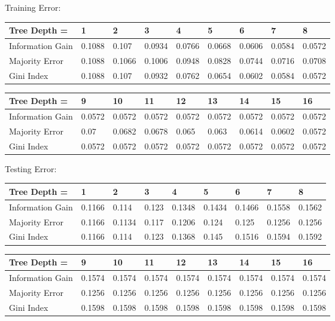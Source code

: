 \documentclass[12pt, fullpage,letterpaper]{article}
\begin{document}
\begin{enumerate}
\begin{enumerate}
	  \newline
	Training Error:
	\begin{table}[h]
		\begin{tabular}{l||llllllll}
			Tree Depth = & 1 & 2 & 3 & 4 & 5 & 6 & 7 & 8 \\
			\hline\hline
			Information Gain & 0.1088 & 0.107 & 0.0934 & 0.0766 & 0.0668 &  0.0606 & 0.0584 & 0.0572 \\
			Majority Error & 0.1088 & 0.1066 & 0.1006 & 0.0948 & 0.0828 & 0.0744 & 0.0716 & 0.0708 \\
			Gini Index & 0.1088 & 0.107 & 0.0932 & 0.0762 & 0.0654 & 0.0602 & 0.0584 & 0.0572 \\ 
		\end{tabular}
	\end{table}

	\begin{table}[h]
		\begin{tabular}{l||llllllll}
			Tree Depth = & 9 & 10 & 11 & 12 & 13 & 14 & 15 & 16 \\
			\hline\hline
			Information Gain & 0.0572 & 0.0572 & 0.0572 & 0.0572 & 0.0572 & 0.0572 & 0.0572 & 0.0572 \\
			Majority Error & 0.07 & 0.0682 & 0.0678 & 0.065 & 0.063 & 0.0614 & 0.0602 & 0.0572 \\
			Gini Index & 0.0572 & 0.0572 & 0.0572 & 0.0572 & 0.0572 & 0.0572 & 0.0572 & 0.0572 \\ 
		\end{tabular}
	\end{table}
	
	Testing Error:
	\begin{table}[h]
		\begin{tabular}{l||llllllll}
			Tree Depth = & 1 & 2 & 3 & 4 & 5 & 6 & 7 & 8 \\
			\hline\hline
			Information Gain & 0.1166 & 0.114 & 0.123 & 0.1348 & 0.1434 & 0.1466 & 0.1558 & 0.1562 \\
			Majority Error & 0.1166 & 0.1134 & 0.117 & 0.1206 & 0.124 & 0.125 & 0.1256 & 0.1256 \\
			Gini Index & 0.1166 & 0.114 & 0.123 & 0.1368 & 0.145 & 0.1516 & 0.1594 & 0.1592 \\
		\end{tabular}
	\end{table}
	
	\begin{table}[!h]
		\begin{tabular}{l||llllllll}
			Tree Depth = & 9 & 10 & 11 & 12 & 13 & 14 & 15 & 16 \\
			\hline\hline
			Information Gain & 0.1574 & 0.1574 & 0.1574 & 0.1574 & 0.1574 & 0.1574 & 0.1574 & 0.1574 \\
			Majority Error & 0.1256 & 0.1256 & 0.1256 & 0.1256 & 0.1256 & 0.1256 & 0.1256 & 0.1256 \\
			Gini Index & 0.1598 & 0.1598 & 0.1598 & 0.1598 & 0.1598 & 0.1598 & 0.1598 & 0.1598 \\ 
		\end{tabular}
	\end{table}


\end{enumerate}
\end{enumerate}
\end{document}
